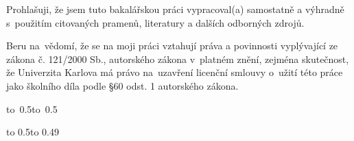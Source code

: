 \noindent
Prohlašuji, že jsem tuto bakalářskou práci vypracoval(a) samostatně a výhradně
s~použitím citovaných pramenů, literatury a dalších odborných zdrojů.

\medskip\noindent
Beru na~vědomí, že se na moji práci vztahují práva a povinnosti vyplývající
ze zákona č. 121/2000 Sb., autorského zákona v~platném znění, zejména skutečnost,
že Univerzita Karlova má právo na~uzavření licenční smlouvy o~užití této
práce jako školního díla podle §60 odst. 1 autorského zákona.

\vspace{10mm}

\hbox{\hbox to 0.5\hbox to 0.5}

\vspace{20mm}
\newpage


\openright

\noindent
\Podekovani

\newpage


\openright

\vbox to 0.5\break\vbox to 0.49

\newpage

\openright
\pagestyle{plain}
\setcounter{page}{1}
